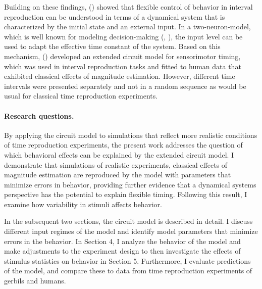 \documentclass[10pt, a4paper]{article}
\begin{document}

Building on these findings, \citeauthor{Remington2018} (\citeyear{Remington2018}) showed that flexible control of behavior in interval reproduction can be understood in terms of a dynamical system that is characterized by the initial state and an external input.
In a two-neuron-model, which is well known for modeling decision-making (\cite{Wang2002}, \cite{Roxin2008}), the input level can be used to adapt the effective time constant of the system.
Based on this mechanism, \citeauthor{Egger2020} (\citeyear{Egger2020}) developed an extended circuit model for sensorimotor timing, which was used in interval reproduction tasks and fitted to human data that exhibited classical effects of magnitude estimation. 
However, different time intervals were presented separately and not in a random sequence as would be usual for classical time reproduction experiments. 


\paragraph{Research questions.}
By applying the circuit model to simulations that reflect more realistic conditions of time reproduction experiments, the present work addresses the question of which behavioral effects can be explained by the extended circuit model. 
I demonstrate that simulations of realistic experiments, classical effects of magnitude estimation are reproduced by the model with parameters that minimize errors in behavior, providing further evidence that a dynamical systems perspective has the potential to explain flexible timing.
Following this result, I examine how variability in stimuli affects behavior. 

In the subsequent two sections, the circuit model is described in detail. 
I discuss different input regimes of the model and identify model parameters that minimize errors in the behavior. 
In Section 4, I analyze the behavior of the model and make adjustments to the experiment design to then investigate the effects of stimulus statistics on behavior in Section 5. 
Furthermore, I evaluate predictions of the model, and compare these to data from time reproduction experiments of gerbils and humans.
\clearpage
\end{document}
